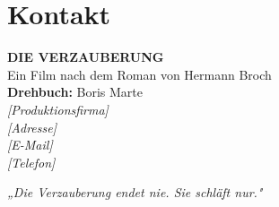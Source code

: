 \documentclass[11pt,a4paper,twoside]{book}
\begin{document}
\chapter{Kontakt}

\begin{tcolorbox}
\begin{center}
\textbf{DIE VERZAUBERUNG}\\
Ein Film nach dem Roman von Hermann Broch\\[1em]

\textbf{Drehbuch:} Boris Marte\\[1em]

\textit{[Produktionsfirma]}\\
\textit{[Adresse]}\\
\textit{[E-Mail]}\\
\textit{[Telefon]}
\end{center}
\end{tcolorbox}

\vfill

\begin{center}
\textit{„Die Verzauberung endet nie. Sie schläft nur."}
\end{center}
\end{document}
